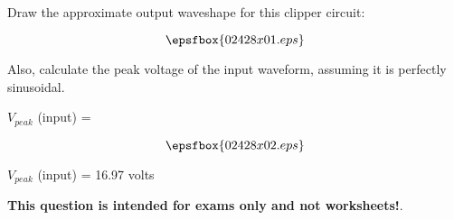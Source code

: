 

Draw the approximate output waveshape for this clipper circuit:

$$\epsfbox{02428x01.eps}$$

Also, calculate the peak voltage of the input waveform, assuming it is perfectly sinusoidal.

\vskip 5pt

$V_{peak}$ (input) = 







$$\epsfbox{02428x02.eps}$$

$V_{peak}$ (input) = 16.97 volts







{\bf This question is intended for exams only and not worksheets!}.




